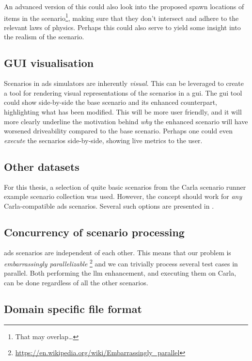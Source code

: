 An advanced version of this could also look into the proposed spawn locations of items in the
scenario\footnote{That may overlap\ldots}, making sure that they don't intersect and adhere to the
relevant laws of physics. Perhaps this could also serve to yield some insight into the realism of
the scenario.

\subsection{GUI visualisation}

Scenarios in \acrshort{ads} simulators are inherently \emph{visual}. This can be leveraged to create
a tool for rendering visual representations of the scenarios in a \acrfull{gui}. The \acrshort{gui}
tool could show side-by-side the base scenario and its enhanced counterpart, highlighting what has
been modified.
This will be more user friendly, and it will more clearly underline the motivation behind \emph{why}
the enhanced scenario will have worsened driveability compared to the base scenario.
Perhaps one could even \emph{execute} the secnarios side-by-side, showing live metrics to the user.

\subsection{Other datasets}

For this thesis, a selection of quite basic scenarios from the Carla scenario runner example
scenario collection was used. However, the concept should work for \emph{any} Carla-compatible
\acrshort{ads} scenarios. Several such options are presented in .

\subsection{Concurrency of scenario processing}

\acrshort{ads} scenarios are independent of each other. This means that our problem is
\textit{embarrassingly parallelizable}
\footnote{\url{https://en.wikipedia.org/wiki/Embarrassingly_parallel}} and we can trivially process
several test cases in parallel. Both performing the \acrshort{llm} enhancement, and executing them
on Carla, can be done regardless of all the other scenarios.


\subsection{Domain specific file format}

